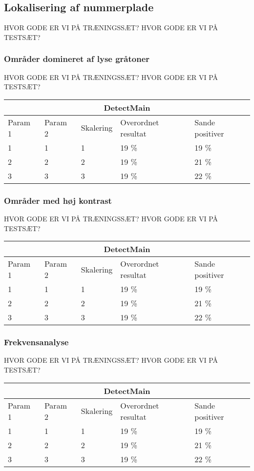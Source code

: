 
\subsection{Lokalisering af nummerplade}
HVOR GODE ER VI PÅ TRÆNINGSSÆT?
HVOR GODE ER VI PÅ TESTSÆT?

\subsubsection{Områder domineret af lyse gråtoner}
HVOR GODE ER VI PÅ TRÆNINGSSÆT?
HVOR GODE ER VI PÅ TESTSÆT?

\begin{tabular}{|l|l|l|l|l|}
\hline
\multicolumn{5}{|c|}{DetectMain} \\ \hline
Param 1 & Param 2 & Skalering & Overordnet resultat & Sande positiver\\ \hline
1 & 1 & 1 & 19 \% & 19 \%\\ \hline
2 & 2 & 2 & 19 \% & 21 \% \\ \hline
3 & 3 & 3 & 19 \% & 22 \% \\
\hline
\end{tabular}

\subsubsection{Områder med høj kontrast}
HVOR GODE ER VI PÅ TRÆNINGSSÆT?
HVOR GODE ER VI PÅ TESTSÆT?

\begin{tabular}{|l|l|l|l|l|}
\hline
\multicolumn{5}{|c|}{DetectMain} \\ \hline
Param 1 & Param 2 & Skalering & Overordnet resultat & Sande positiver\\ \hline
1 & 1 & 1 & 19 \% & 19 \%\\ \hline
2 & 2 & 2 & 19 \% & 21 \% \\ \hline
3 & 3 & 3 & 19 \% & 22 \% \\
\hline
\end{tabular}

\subsubsection{Frekvensanalyse}
HVOR GODE ER VI PÅ TRÆNINGSSÆT?
HVOR GODE ER VI PÅ TESTSÆT?

\begin{tabular}{|l|l|l|l|l|}
\hline
\multicolumn{5}{|c|}{DetectMain} \\ \hline
Param 1 & Param 2 & Skalering & Overordnet resultat & Sande positiver\\ \hline
1 & 1 & 1 & 19 \% & 19 \%\\ \hline
2 & 2 & 2 & 19 \% & 21 \% \\ \hline
3 & 3 & 3 & 19 \% & 22 \% \\
\hline
\end{tabular}

